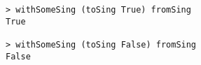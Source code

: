 \begin{repl}\begin{lstlisting}
> withSomeSing (toSing True) fromSing
True

> withSomeSing (toSing False) fromSing
False\end{lstlisting}\end{repl}
